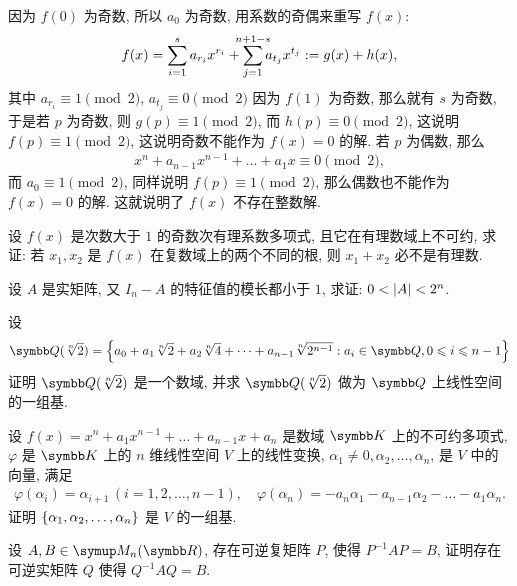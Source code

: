 \begin{exercise}[series=exer]
\begin{answer}
        因为 $ f(0) $ 为奇数, 所以 $ a_{0} $ 为奇数, 用系数的奇偶来重写 $ f(x) $:
        \begin{align*}
            f(x) = \sum_{i = 1}^{s}a_{r_{i}}x^{r_{i}} + \sum_{j = 1}^{\mathclap{n + 1 - s}}a_{t_{j}}x^{t_{j}} := g(x) + h(x),
        \end{align*}
        其中 $ a_{r_{i}} \equiv 1 \pmod{2} $, $ a_{t_{j}} \equiv 0 \pmod{2} $ 因为 $ f(1) $ 为奇数, 那么就有 $ s $ 为奇数, 于是若 $ p $ 为奇数, 则 $ g(p) \equiv 1 \pmod{2} $, 而 $ h(p) \equiv 0 \pmod{2} $, 这说明 $ f(p) \equiv 1 \pmod{2} $, 这说明奇数不能作为 $ f(x) = 0 $ 的解. 若 $ p $ 为偶数, 那么 
        \begin{align*}
            x^{n} + a_{n - 1}x^{n - 1} + \dots + a_{1}x \equiv 0 \pmod{2},
        \end{align*}
        而 $ a_{0} \equiv 1 \pmod{2} $, 同样说明 $ f(p) \equiv 1 \pmod{2} $, 那么偶数也不能作为 $ f(x) = 0 $ 的解. 这就说明了 $ f(x) $ 不存在整数解.
    \end{answer}
    \item 设 $ f(x) $ 是次数大于 $ 1 $ 的奇数次有理系数多项式, 且它在有理数域上不可约, 求证: 若 $ x_{1}, x_{2} $ 是 $ f(x) $ 在复数域上的两个不同的根, 则 $ x_{1} + x_{2} $ 必不是有理数.
    \item 设 $ A $ 是实矩阵, 又 $ I_{n} - A $ 的特征值的模长都小于 $ 1 $, 求证: $ 0<\abs{A}<2^{n} $. 
    \item 设
    \begin{align*}
        \Q(\sqrt[n]{2}) = \set{a_{0} + a_{1}\sqrt[n]{2} + a_{2}\sqrt[n]{4} + \dots + a_{n-1}\sqrt[n]{2^{n-1}} : a_{i} \in \Q, 0\le i\le n-1}
    \end{align*}
    证明 $ \Q(\sqrt[n]{2}) $ 是一个数域, 并求 $ \Q(\sqrt[n]{2}) $ 做为 $ \Q $ 上线性空间的一组基.
    \item 设 $ f(x) = x^{n} + a_{1}x^{n-1} + \dots + a_{n-1}x + a_{n} $ 是数域 $ \K $ 上的不可约多项式, $ \varphi $ 是 $ \K $ 上的 $ n $ 维线性空间 $ V $ 上的线性变换, $ \alpha_{1} \ne 0, \alpha_{2}, \dots, \alpha_{n} $, 是 $ V $ 中的向量, 满足 
    \begin{align*}
        \varphi(\alpha_{i}) = \alpha_{i + 1}\,(i = 1, 2, \dots, n-1), \quad \varphi(\alpha_{n}) = -a_{n}\alpha_{1} - a_{n-1}\alpha_{2} - \dots - a_{1}\alpha_{n}.
    \end{align*}
    证明 $ \qty{\alpha_{1}, \alpha_{2}, \dots, \alpha_{n}} $ 是 $ V $ 的一组基. 
    \item\label{item:CtoR} 设 $ A, B \in \MM $, 存在可逆复矩阵 $ P $, 使得 $ P^{-1}AP = B $, 证明存在可逆实矩阵 $ Q $ 使得 $ Q^{-1}AQ = B $.

\end{exercise}

